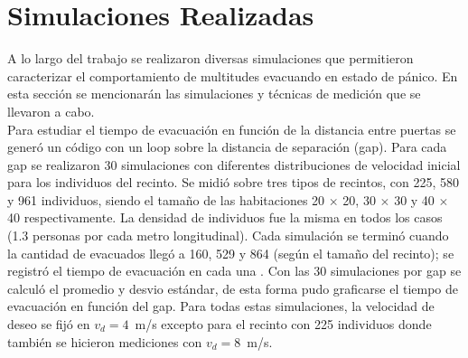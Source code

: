 \section{Simulaciones Realizadas}

A lo largo del trabajo se realizaron diversas simulaciones que permitieron caracterizar el comportamiento de multitudes evacuando en estado de pánico. En esta sección se mencionarán las simulaciones y técnicas de medición que se llevaron a cabo.\\

Para estudiar el tiempo de evacuación en función de la distancia entre puertas se generó un código con un loop sobre la distancia de separación (gap). Para cada gap se realizaron 30 simulaciones con diferentes distribuciones de velocidad inicial para los individuos del recinto. Se midió sobre tres tipos de recintos, con 225, 580 y 961 individuos, siendo el tamaño de las habitaciones 20 $\times$ 20, 30 $\times$ 30 y 40 $\times$ 40 respectivamente. La densidad de individuos fue la misma en todos los casos (1.3 personas por cada metro longitudinal). Cada simulación se terminó cuando la cantidad de evacuados llegó a 160, 529 y 864 (según el tamaño del recinto); se registró el tiempo de evacuación en cada una . Con las 30 simulaciones por gap se calculó el promedio y desvio estándar, de esta forma pudo graficarse el tiempo de evacuación en función del gap. Para todas estas simulaciones, la velocidad de deseo se fijó en $v_d=4$~m/s excepto para el recinto con 225 individuos donde también se hicieron mediciones con $v_d=8$~m/s.  \\



